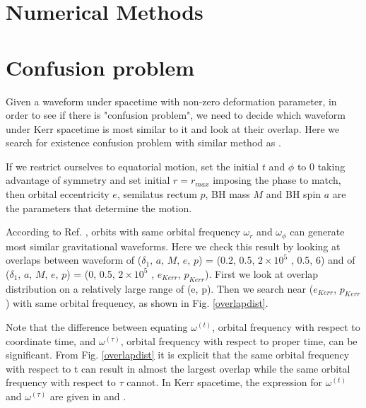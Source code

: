 \documentclass{article}
\begin{document}
\section{Numerical Methods}
\cite{kludge}
\section{Confusion problem}

Given a waveform under spacetime with non-zero deformation parameter, in order to see if there is "confusion problem", we need to decide which waveform under Kerr spacetime is most similar to it and look at their overlap. Here we search for existence confusion problem with similar method as \cite{majorPRD}.

If we restrict ourselves to equatorial motion, set the initial $t$ and $\phi$ to 0 taking advantage of symmetry and set initial $r=r_{max}$ imposing the phase to match, then orbital eccentricity $e$, semilatus rectum $p$, BH mass $M$ and BH spin $a$ are the parameters that determine the motion.

According to Ref. \cite{sameOmg}, orbits with same orbital frequency $\omega_r$ and $\omega_\phi$ can generate most similar gravitational waveforms. Here we check this result by looking at overlaps between waveform of ($\delta_1,\, a,\, M,\, e,\, p$) = (0.2, 0.5, $2 \times 10^5 $ , 0.5, 6) and of ($\delta_1,\, a,\, M,\, e,\, p$) = (0, 0.5, $2 \times 10^5 $ , $e_{Kerr}$, $p_{Kerr}$). First we look at overlap distribution on a relatively large range of (e, p). Then we search near ($e_{Kerr}$, $p_{Kerr}$) with same orbital frequency, as shown in Fig. \ref{overlapdist}. 

Note that the difference between equating $\omega^{(t)}$, orbital frequency with respect to coordinate time, and $\omega^{(\tau)}$, orbital frequency with respect to proper time, can be significant. From Fig. \ref{overlapdist} it is explicit that the same orbital frequency with respect to t can result in almost the largest overlap while the same orbital frequency with respect to $\tau$ cannot. In Kerr spacetime, the expression for $\omega^{(t)}$ and $\omega^{(\tau)}$ are given in \cite{tOmg} and \cite{tauOmg}.
\end{document}
